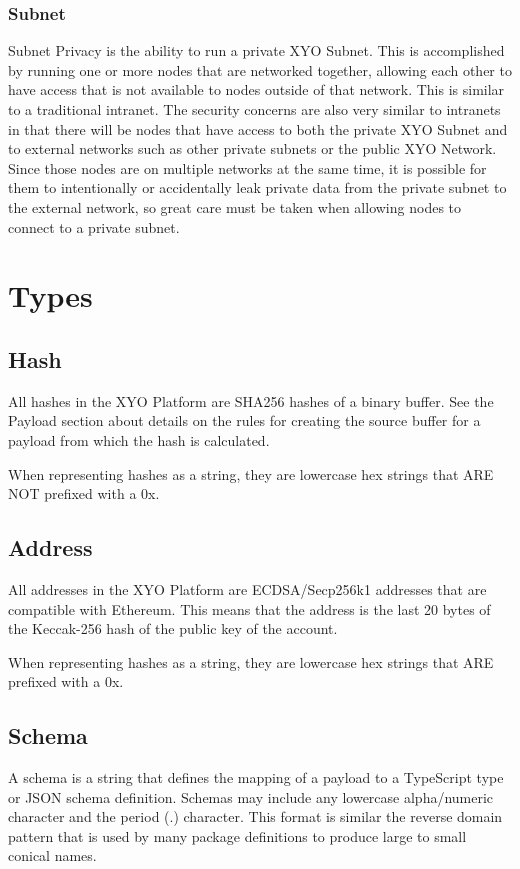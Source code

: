 \documentclass{article}
\begin{document}
\subsubsection{Subnet}
Subnet Privacy is the ability to run a private XYO Subnet.  This is accomplished by running one or more nodes that are networked together, allowing each other to have access that is not available to nodes outside of that network.  This is similar to a traditional intranet.  The security concerns are also very similar to intranets in that there will be nodes that have access to both the private XYO Subnet and to external networks such as other private subnets or the public XYO Network.  Since those nodes are on multiple networks at the same time, it is possible for them to intentionally or accidentally leak private data from the private subnet to the external network, so great care must be taken when allowing nodes to connect to a private subnet.

\clearpage
\section{Types}
\subsection{Hash}
All hashes in the XYO Platform are SHA256 hashes of a binary buffer.  See the Payload section about details on the rules for creating the source buffer for a payload from which the hash is calculated. 

When representing hashes as a string, they are lowercase hex strings that ARE NOT prefixed with a 0x.

\subsection{Address}
All addresses in the XYO Platform are ECDSA/Secp256k1 addresses that are compatible with Ethereum.  This means that the address is the last 20 bytes of the Keccak-256 hash of the public key of the account.

When representing hashes as a string, they are lowercase hex strings that ARE prefixed with a 0x.

\subsection{Schema}
A schema is a string that defines the mapping of a payload to a TypeScript type or JSON schema definition.  Schemas may include any lowercase alpha/numeric character and the period (.) character.  This format is similar the reverse domain pattern that is used by many package definitions to produce large to small conical names.
\end{document}
